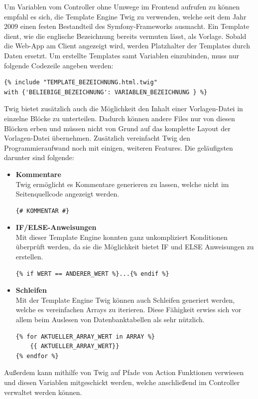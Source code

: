 Um Variablen vom Controller ohne Umwege im Frontend aufrufen zu können empfahl es sich, die Template Engine {Twig\cite{twig}} zu verwenden, welche seit dem Jahr 2009 einen festen Bestandteil des Symfony-Frameworks ausmacht. Ein Template dient, wie die englische Bezeichnung bereits vermuten lässt, als Vorlage. Sobald die Web-App am Client angezeigt wird, werden Platzhalter der Templates durch Daten ersetzt. 
Um erstellte Templates samt Variablen einzubinden, muss nur folgende Codezeile angeben werden:
	\lstset{language = php}
  	\begin{lstlisting}
{% include "TEMPLATE_BEZEICHNUNG.html.twig" 
with {'BELIEBIGE_BEZEICHNUNG': VARIABLEN_BEZEICHNUNG } %}
  	\end{lstlisting}
Twig bietet zusätzlich auch die Möglichkeit den Inhalt einer Vorlagen-Datei in einzelne Blöcke zu unterteilen. Dadurch können andere Files nur von diesen Blöcken erben und müssen nicht von Grund auf das komplette Layout der Vorlagen-Datei übernehmen.
Zusätzlich vereinfacht Twig den Programmieraufwand noch mit einigen, weiteren Features. Die geläufigsten darunter sind folgende:
\begin{itemize}
    \item \textbf{Kommentare}\\
Twig ermöglicht es Kommentare generieren zu lassen, welche nicht im Seitenquellcode angezeigt werden. 
\lstset{language = html}
  	\begin{lstlisting}
{# KOMMENTAR #}
	\end{lstlisting}
    \item \textbf{IF/ELSE-Anweisungen}\\
Mit dieser Template Engine konnten ganz unkompliziert Konditionen überprüft werden, da sie die Möglichkeit bietet IF und ELSE Anweisungen zu erstellen.
\lstset{language = php}
  	\begin{lstlisting}
{% if WERT == ANDERER_WERT %}...{% endif %}
	\end{lstlisting}
    \item \textbf{Schleifen}\\
Mit der Template Engine Twig können auch Schleifen generiert werden, welche es vereinfachen Arrays zu iterieren. Diese Fähigkeit erwies sich vor allem beim Auslesen von Datenbanktabellen als sehr nützlich.
\lstset{language = php}
  	\begin{lstlisting}
{% for AKTUELLER_ARRAY_WERT in ARRAY %}
	{{ AKTUELLER_ARRAY_WERT}}
{% endfor %}
	\end{lstlisting}
  \end{itemize}  
Außerdem kann mithilfe von Twig auf Pfade von Action Funktionen verwiesen und diesen Variablen mitgeschickt werden, welche anschließend im Controller verwaltet werden können.

